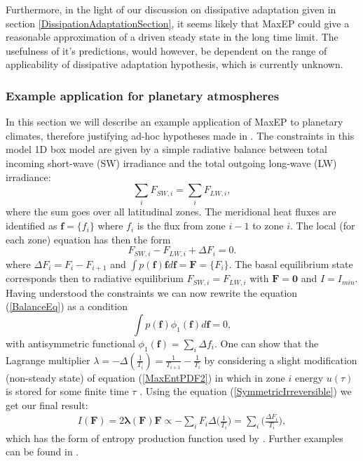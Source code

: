 \documentclass[a4paper,12pt]{article}
\begin{document}
Furthermore, in the light of our discussion on dissipative adaptation given in section \ref{DissipationAdaptationSection}, it seems likely that MaxEP could give a reasonable approximation of a driven steady state in the long time limit. The usefulness of it's predictions, would however, be dependent on the range of applicability of dissipative adaptation hypothesis, which is currently unknown.

\subsubsection{Example application for planetary atmospheres}

In this section we will describe an example application of MaxEP to planetary climates, therefore justifying ad-hoc hypotheses made in \cite{Paltridge:2007jf}\cite{Lorenz:J80tzZkl}.
The constraints in this model 1D box model are given by a simple radiative balance between total incoming short-wave (SW) irradiance and the total outgoing long-wave (LW) irradiance:
\begin{equation}
\label{BalanceEq}
  \sum_i F_{SW,i}= \sum_i F_{LW,i},
\end{equation}
where the sum goes over all latitudinal zones. The meridional heat fluxes are identified as $\bm{f}=\{f_i\}$ where $f_i$ is the flux from zone $i-1$ to zone $i$. 
The local (for each zone) equation has then the form
\begin{equation}
  F_{SW,i}- F_{LW,i} + \Delta F_i = 0.
\end{equation}
where $\Delta F_i = F_i - F_{i+1}$ and $\int p(\bm{f})\bm{f} d\bm{f}=\bm{F}=\{F_i\}$. 
The basal equilibrium state corresponds then to radiative equilibrium $F_{SW,i}= F_{LW,i}$ with $\bm{F}=\bm{0}$ and $I=I_{min}$. Having understood the constraints we can now rewrite the equation (\ref{BalanceEq}) as a condition
\begin{equation}
  \int p(\bm{f})\phi_1(\bm{f})d\bm{f} =0,
\end{equation}
with antisymmetric functional $\phi_1(\bm{f})=\sum_i \Delta f_i$. 
One can show that the Lagrange multiplier $\lambda = - \Delta (\frac{1}{T_i}) = \frac{1}{T_{i+1}}-\frac{1}{T_i}$ by considering a slight modification (non-steady state) of equation (\ref{MaxEntPDF2}) in which in zone $i$ energy $u(\tau)$ is stored for some finite time $\tau$ \cite{Dewar:2014ek}. 
Using the equation (\ref{SymmetricIrreversible}) we get our final result:
\begin{equation}
\begin{aligned}
  I(\bm{F})=2 \bm{\lambda}(\bm{F})\bm{F} \propto - \sum_i F_i \Delta\bigg(\frac{1}{T_i}\bigg)= \sum_i \bigg(\frac{\Delta F_i}{T_i}\bigg),
\end{aligned}
\end{equation}
which has the form of entropy production function used by \cite{Paltridge:2007jf, Lorenz:J80tzZkl}.
Further examples can be found in \cite{Dewar:2014ek}.
\end{document}
